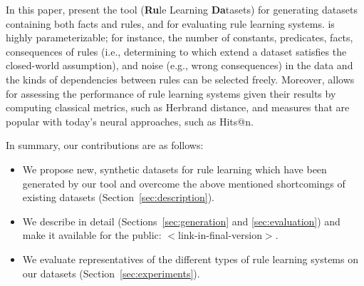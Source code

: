 In this paper,
% 
present the tool \tool (\textbf{Ru}le Learning \textbf{Da}tasets) for generating datasets containing both facts and rules, and for evaluating rule learning systems. %
\tool is highly parameterizable; for instance, the number of constants, predicates, facts, consequences of rules (i.e., determining to which extend a dataset satisfies the closed-world assumption), and noise (e.g., wrong consequences) in the data and the kinds of dependencies between rules can be selected freely.
Moreover, \tool allows for assessing the performance of rule learning systems given their results by computing classical metrics, such as Herbrand distance, and measures that are popular with today's neural approaches, such as Hits@n.

In summary, our contributions are as follows:
\begin{itemize}
\item We propose new, synthetic datasets for rule learning which have been generated by our tool \tool and overcome the above mentioned shortcomings of existing datasets (Section~\ref{sec:description}).
\item We describe \tool in detail (Sections~\ref{sec:generation} and \ref{sec:evaluation}) and make it available for the public: $<$link-in-final-version$>$.
\item We evaluate representatives of the different types of rule learning systems on our datasets (Section~\ref{sec:experiments}).
\end{itemize}



